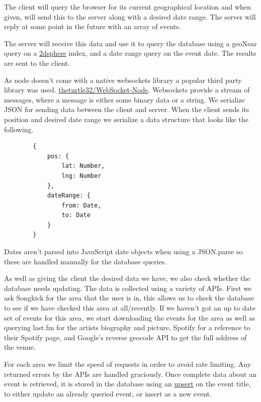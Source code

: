 \documentclass[10pt]{article}
\begin{document}
        The client will query the browser for its current geographical location and when given, will send this to the server along with a desired date range. The server will reply at some point in the future with an array of events.

        The server will receive this data and use it to query the database using a geoNear query on a \href{https://docs.mongodb.com/manual/core/2dsphere/}{2dsphere} index, and a date range query on the event date. The results are sent to the client.

        As node doesn't come with a native websockets library a popular third party library was used. \href{https://github.com/theturtle32/WebSocket-Node}{theturtle32/WebSocket-Node}. Websockets provide a stream of messages, where a message is either some binary data or a string. We serialize JSON for sending data between the client and server. When the client sends its position and desired date range we serialize a data structure that looks like the following.

        \begin{verbatim}
        {
            pos: {
                lat: Number,
                lng: Number
            },
            dateRange: {
                from: Date,
                to: Date
            }
        }
        \end{verbatim}

        Dates aren't parsed into JavaScript date objects when using a JSON.parse so these are handled manually for the database queries.

        As well as giving the client the desired data we have, we also check whether the database needs updating. The data is collected using a variety of APIs. First we ask Songkick for the area that the user is in, this allows us to check the database to see if we have checked this area at all/recently. If we haven't got an up to date set of events for this area, we start downloading the events for the area as well as querying last.fm for the artists biography and picture, Spotify for a reference to their Spotify page, and Google's reverse geocode API to get the full address of the venue.

        For each area we limit the speed of requests in order to avoid rate limiting. Any returned errors by the APIs are handled graciously. Once complete data about an event is retrieved, it is stored in the database using an \href{https://docs.mongodb.com/manual/reference/method/db.collection.update/#upsert-option}{upsert} on the event title, to either update an already queried event, or insert as a new event.
\end{document}
